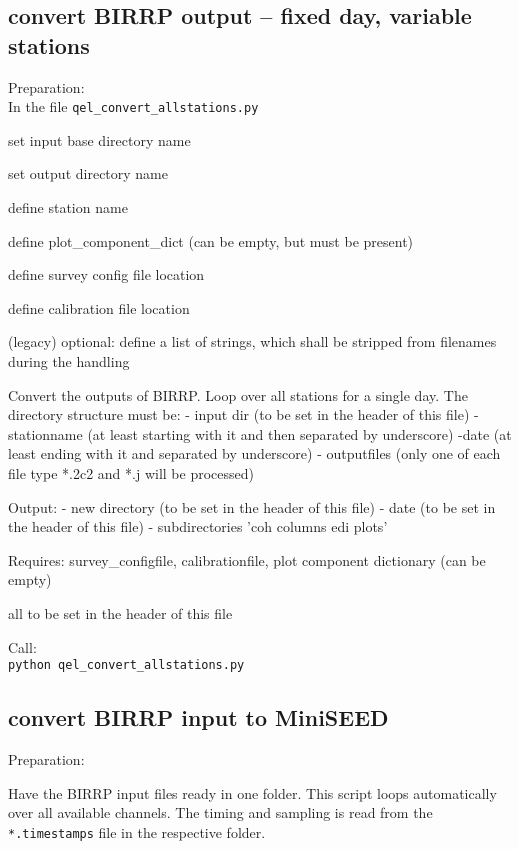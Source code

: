 \documentclass[11pt,DIV=12]{scrartcl}
\begin{document}
\subsection{convert BIRRP output -- fixed day, variable stations}

Preparation:\\

In the file \texttt{qel\_convert\_allstations.py}
\begin{itemize*}
\item set input base directory name 
\item set output directory name
\item define station name
\item define plot\_component\_dict (can be empty, but must be present)
\item define survey config file location
\item define calibration file location
\item (legacy) optional: define a list of strings, which shall be stripped from filenames during the handling 
\end{itemize*}
Convert the outputs of BIRRP. Loop over all stations for a single day.
The directory structure must be:
- input dir (to be set in the header of this file)
 - stationname (at least starting with it and then separated by underscore)
     -date (at least ending with it and  separated by underscore)
       - outputfiles (only one of each file type *.2c2 and *.j will be processed)

Output:
- new directory (to be set in the header of this file)
    - date (to be set in the header of this file)
        - subdirectories 'coh columns edi plots'


Requires: 
survey\_configfile, 
calibrationfile,
plot component dictionary (can be empty)
 
 all to be set in the header of this file


Call:\\

\texttt{python qel\_convert\_allstations.py}






\subsection{convert BIRRP input to MiniSEED}


Preparation:

Have the BIRRP input files ready in one folder. This script loops automatically over all available channels. The timing and sampling is read from the \texttt{*.timestamps} file in the respective folder.\\
\end{document}
